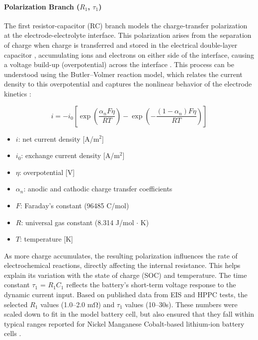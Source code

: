 \documentclass[conference]{IEEEtran}
\begin{document}
\paragraph{\textbf{Polarization Branch ($R_1$, $\tau_1$)}}
The first resistor-capacitor (RC) branch models the charge-transfer polarization at the electrode-electrolyte interface. This polarization arises from the separation of charge when charge is transferred and stored in the electrical double-layer capacitor \cite{SOAVI20201}, accumulating ions and electrons on either side of the interface, causing a voltage build-up (overpotential) across the interface \cite{sudhakar2018biopolymer}. This process can be understood using the Butler–Volmer reaction model, which relates the current density to this overpotential and captures the nonlinear behavior of the electrode kinetics \cite{MARSHALL201875}:

\begin{equation}
    i = -i_0 \left[ \exp\left( \frac{ \alpha_n F \eta }{RT} \right) - \exp\left( -\frac{ (1- \alpha_n) F \eta }{RT} \right) \right]
\end{equation}

\begin{itemize}
  \item \( i \): net current density [A/m\(^2\)]
  \item \( i_0 \): exchange current density [A/m\(^2\)]
  \item \( \eta \): overpotential [V]
  \item \( \alpha_n \): anodic and cathodic charge transfer coefficients
  \item \( F \): Faraday’s constant (96485 C/mol)
  \item \( R \): universal gas constant (8.314 J/mol $\cdot$ K)
  \item \( T \): temperature [K]
\end{itemize}

As more charge accumulates, the resulting polarization influences the rate of electrochemical reactions, directly affecting the internal resistance. This helps explain its variation with the state of charge (SOC) and temperature. The time constant $\tau_1$ = $R_1$$C_1$ reflects the battery's short-term voltage response to the dynamic current input. Based on published data from EIS and HPPC tests, the selected $R_1$ values (1.0–2.0 m\si{\ohm}) and $\tau_1$ values (10–30s). These numbers were scaled down to fit in the model battery cell, but also ensured that they fall within typical ranges reported for Nickel Manganese Cobalt-based lithium-ion battery cells \cite{mondal} \cite{Wang}.
\end{document}
